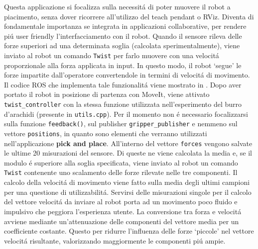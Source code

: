Questa applicazione si focalizza sulla necessit\'{a} di poter muovere il robot a piacimento, senza dover ricorrere all'utilizzo 
del teach pendant o RViz. 
Diventa di fondamentale importanza se integrata in applicazioni collaborative, per rendere pi\'{u} user friendly l'interfacciamento 
con il robot. 
Quando il sensore rileva delle forze superiori ad una determinata soglia (calcolata sperimentalmente), viene inviato al robot un 
comando \verb|Twist| per farlo muovere con una velocit\'{a} proporzionale alla forza applicata in input. In questo modo, il robot `segue' 
le forze impartite dall'operatore convertendole in termini di velocit\'{a} di movimento. 
Il codice ROS che implementa tale funzionalit\'{a} viene mostrato in \cite{force_follower}. 
Dopo aver portato il robot in posizione di partenza con MoveIt, viene attivato \verb|twist_controller| con la stessa funzione 
utilizzata nell'esperimento del burro d'arachidi (presente in \verb|utils.cpp|). 
Per il momento non \'{e} necessario focalizzarsi sulla funzione \verb|feedback()|, sul publisher \verb|gripper_publisher| e nemmeno 
sul vettore \verb|positions|, in quanto sono elementi che verranno utilizzati nell'applicazione \textbf{pick and place}. 
All'interno del vettore \verb|forces| vengono salvate le ultime 20 misurazioni del sensore. Di queste ne viene calcolata la media 
e, se il modulo \'{e} superiore alla soglia specificata, viene inviato al robot un comando \verb|Twist| contenente uno scalamento delle 
forze rilevate nelle tre componenti. Il calcolo della velocit\'{a} di movimento viene fatto sulla media degli ultimi campioni 
per una questione di utilizzabilit\'{a}. Servirsi delle misurazioni singole per il calcolo del vettore velocit\'{a} da inviare al robot 
porta ad un movimento poco fluido e impulsivo che peggiora l'esperienza utente. 
La conversione tra forza e velocit\'{a} avviene mediante un'attenuazione delle componenti del vettore media per un coefficiente 
costante. Questo per ridurre l'influenza delle forze `piccole' nel vettore velocit\'{a} risultante, valorizzando maggiormente le 
componenti pi\'{u} ampie. 
